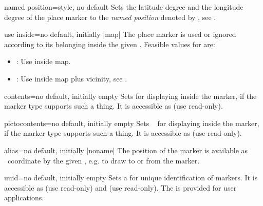 \begin{docMrcKey}[marker]{named position}{=}{style, no default}
  Sets the latitude degree and the longitude degree of the place marker
  to the \emph{named position} denoted by , see .
\end{docMrcKey}

\begin{docMrcKey}[marker]{use inside}{=}{no default, initially |map|}
  The place marker is used or ignored according to its belonging inside the
  given . Feasible values for  are:
  \begin{itemize}
  \item{}: Use inside map.
  \item{}: Use inside map plus vicinity, see .
  \end{itemize}
\end{docMrcKey}


\begin{docMrcKey}[marker]{contents}{=}{no default, initially empty}
  Sets  for displaying inside the marker, if
  the marker type supports such a thing.
  It is accessible as  (use read-only).
\end{docMrcKey}

\begin{docMrcKey}[marker]{pictocontents}{=}{no default, initially empty}
  Sets \tikzname\  for displaying inside the marker, if
  the marker type supports such a thing.
  It is accessible as  (use read-only).
\end{docMrcKey}

\begin{docMrcKey}[marker]{alias}{=}{no default, initially |noname|}
  The position of the marker is available as \tikzname\ coordinate by
  the given , e.g. to draw to or from the marker.
\end{docMrcKey}

\begin{docMrcKey}[marker][doc updated=2020-05-04]{uuid}{=}{no default, initially empty}
  Sets a  for unique identification of markers.
  It is accessible as  (use read-only)
  and  (use read-only).
  The  is provided for user applications.
\end{docMrcKey}

